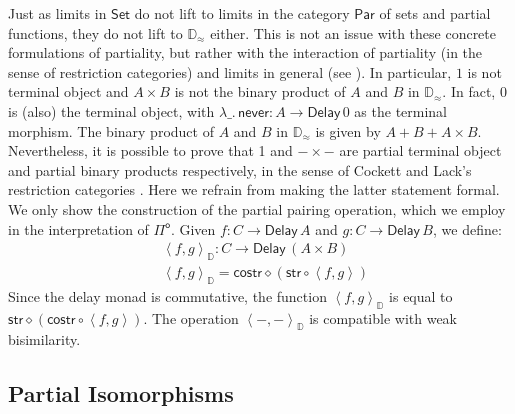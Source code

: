 \documentclass[runningheads]{llncs}
\newcommand{\Pio}{$\mathsf{\Pi}^{\mathsf{o}}$}
\newcommand{\Set}{\mathsf{Set}}
\newcommand{\Par}{\mathsf{Par}}
\newcommand{\comp}{\circ}
\newcommand{\pair}[2]{\left< #1,#2 \right>}
\newcommand{\Delay}{\mathsf{Delay}\,}
\newcommand{\never}{\mathsf{never}}
\newcommand{\str}{\mathsf{str}}
\newcommand{\costr}{\mathsf{costr}}
\newcommand{\D}{\mathbb{D}}
\newcommand{\Dapprox}{\mathbb{D}_{\approx}}
\newcommand{\pairD}[2]{\left< #1,#2 \right>_{\D}}
\begin{document}
Just as limits in $\Set$ do not lift to limits in the category $\Par$ of sets
and partial functions, they do not lift to $\Dapprox$ either. This is not an
issue with these concrete formulations of partiality, but rather with the
interaction of partiality (in the sense of restriction categories) and limits
in general (see \cite[Section 4.4]{CockettL07}). In particular, $1$ is not
terminal object and $A \times B$ is not the binary product of $A$ and $B$ in
$\Dapprox$. In fact, $0$ is (also) the terminal object, with $\lambda \_.\,
\never : A \to \Delay 0$ as the terminal morphism. The
binary product of $A$ and $B$ in $\Dapprox$ is given by
$A + B + A \times B$. Nevertheless, it is possible to prove that 1 and
$- \times -$ are partial terminal object and partial binary products
respectively, in the sense of Cockett and Lack's restriction
categories \cite{CockettL02,CockettL07}. Here we refrain from making the latter
statement formal. We only show the construction of the partial pairing
operation, which we employ in the interpretation of \Pio.  Given
$f : C \to \Delay A$ and $g : C \to \Delay B$, we define:
\begin{align*}
& \pairD f g : C \to \Delay (A \times B) \\
& \pairD f g = \costr \diamond (\str \comp \pair f g)
\end{align*}
Since the delay monad is commutative, the function $\pairD f g$ is
equal to $\str \diamond (\costr \comp \pair f g)$. The operation
$\pairD - -$ is compatible with weak bisimilarity.

\subsection{Partial Isomorphisms}
\label{sec:isos}
\end{document}
